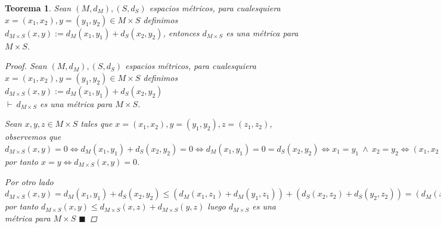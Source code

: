 \documentclass[oneside]{book} %
\theoremstyle{Teorema}
\newtheorem{Teorema}[Definicion]{Teorema}
\theoremstyle{Ejemplos}
\theoremstyle{[Obs]}
\renewcommand{\{}{\left\lbrace} %
\renewcommand{\}}{\right\rbrace} %
\newcommand{\y}{\ \wedge\ } %
\renewcommand{\qed}{$\blacksquare$} %
\newcommand{\pd}{$\vdash\ $} %
\begin{document}
			\begin{Teorema}\setlength{\parindent}{0em}
				
				Sean $(M, d_M), (S, d_S)$ espacios métricos, para cualesquiera $x = (x_1, x_2), y = (y_1, y_2) \in M \times S$ definimos $d_{M \times S}(x, y) := d_M(x_1, y_1) + d_S(x_2, y_2)$, entonces $d_{M \times S}$ es una métrica para $M \times S$.

				\begin{proof}
					
					Sean $(M, d_M), (S, d_S)$ espacios métricos, para cualesquiera $x = (x_1, x_2), y = (y_1, y_2) \in M \times S$ definimos $d_{M \times S}(x, y) := d_M(x_1, y_1) + d_S(x_2, y_2)$ \\ \pd $d_{M \times S}$ es una métrica para $M \times S$.

					Sean $x, y, z \in M \times S$ tales que $x = (x_1, x_2), y = (y_1, y_2), z = (z_1, z_2)$, observemos que $d_{M \times S}(x, y) = 0 \Leftrightarrow d_M(x_1, y_1) + d_S(x_2, y_2) = 0 \Leftrightarrow d_M(x_1, y_1) = 0 = d_S(x_2, y_2) \Leftrightarrow x_1 = y_1 \y x_2 = y_2 \Leftrightarrow (x_1, x_2) = (y_2, y_2) \Leftrightarrow x = y$ por tanto $x = y \Leftrightarrow d_{M \times S}(x, y) = 0$.

					Por otro lado $d_{M \times S}(x, y) = d_M(x_1, y_1) + d_S(x_2, y_2) \leq (d_M(x_1, z_1) + d_M(y_1, z_1)) + (d_S(x_2, z_2) + d_S(y_2, z_2)) = (d_M(x_1, z_1) + d_S(x_2, z_2)) + (d_M(y_1, z_1) + d_S(y_2, z_2)) = d_{M \times S}(x, z) + d_{M \times S}(y, z)$ por tanto $d_{M \times S}(x, y) \leq d_{M \times S}(x, z) + d_{M \times S}(y, z)$ luego $d_{M \times S}$ es una métrica para $M \times S$ \qed

				\end{proof}

			\end{Teorema}
\end{document}
